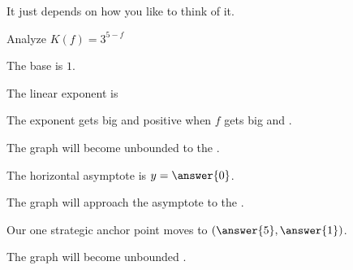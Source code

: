 \documentclass{ximera}
\begin{document}
It just depends on how you like to think of it. \\





\begin{example}  



Analyze   $K(f) = 3^{5-f}$ \\

\begin{question}
 

The base is  $1$.
\end{question}
\begin{question}



\begin{question}

The linear exponent is 

\end{question}


The exponent gets big and positive when $f$ gets big and .
\end{question}
\begin{question}


The graph will become unbounded to the .\\
\end{question}

\begin{question}


The horizontal asymptote is $y = \answer{0}$.
\end{question}

\begin{question}


The graph will approach the asymptote to the .\\
\end{question}
\begin{question}


Our one strategic anchor point moves to $\left(\answer{5}, \answer{1}\right)$.
\end{question}
\begin{question}


The graph will become unbounded .\\
\end{question}





\end{example}
\end{document}
